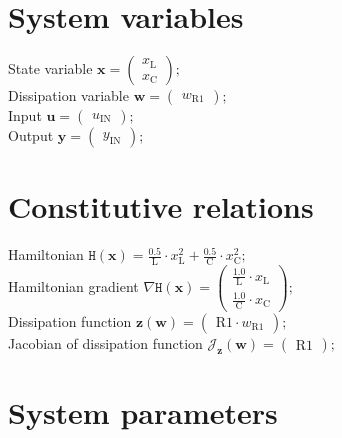 \documentclass[11pt, oneside]{article}      %
\begin{document}
\section{System variables}
%
State variable $ \mathbf{x} = \left(\begin{array}{c}x_{\mathrm{L}}\\x_{\mathrm{C}}\end{array}\right) ; $ 
%
\\
%
Dissipation variable $ \mathbf{w} = \left(\begin{array}{c}w_{\mathrm{R1}}\end{array}\right) ; $ 
%
\\
%
Input $ \mathbf{u} = \left(\begin{array}{c}u_{\mathrm{IN}}\end{array}\right) ; $ 
%
\\
%
Output $ \mathbf{y} = \left(\begin{array}{c}y_{\mathrm{IN}}\end{array}\right) ; $ 
%
\\
%
%
\section{Constitutive relations}
%
Hamiltonian $ \mathtt{H}(\mathbf{x}) = \frac{0.5}{\mathrm{L}} \cdot x_{\mathrm{L}}^{2} + \frac{0.5}{\mathrm{C}} \cdot x_{\mathrm{C}}^{2} ; $ 
%
\\
%
Hamiltonian gradient $ \nabla \mathtt{H}(\mathbf{x}) = \left(\begin{array}{c}\frac{1.0}{\mathrm{L}} \cdot x_{\mathrm{L}}\\\frac{1.0}{\mathrm{C}} \cdot x_{\mathrm{C}}\end{array}\right) ; $ 
%
\\
%
Dissipation function $ \mathbf{z}(\mathbf{w}) = \left(\begin{array}{c}\mathrm{R1} \cdot w_{\mathrm{R1}}\end{array}\right) ; $ 
%
\\
%
Jacobian of dissipation function $ \mathcal{J}_{\mathbf{z}}(\mathbf{w}) = \left(\begin{array}{c}\mathrm{R1}\end{array}\right) ; $ 
%
\\
%
%
\section{System parameters}
%
%
\end{document}
